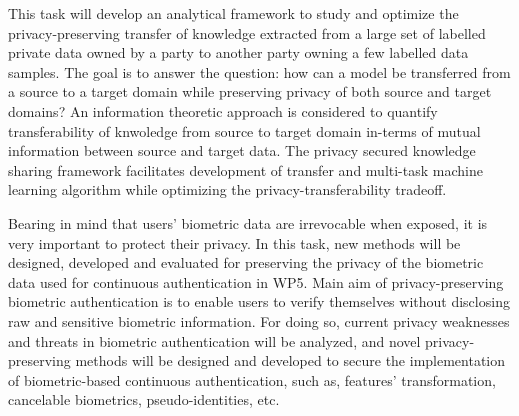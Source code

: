 \begin{Workpackage}{\thewpno}
 \begin{Task}
  
  \TaskResults{%
  }
  \TaskHeader{}
  This task will develop an analytical framework to study and optimize the privacy-preserving transfer of knowledge extracted from a large set of labelled private data owned by a party to another party owning a few labelled data samples. The goal is to answer the question: how can a model be transferred from a source to a target domain while preserving privacy of both source and target domains? An information theoretic approach is considered to quantify transferability of knwoledge from source to target domain in-terms of mutual information between source and target data. The privacy secured knowledge sharing framework facilitates development of transfer and multi-task machine learning algorithm while optimizing the privacy-transferability tradeoff.
 \end{Task}

  
 
 
 \begin{Task}
  
  \TaskResults{%
  }
  \TaskHeader{}
  Bearing in mind that users' biometric data are irrevocable when exposed, it is very important to protect their privacy. In this task, new methods will be designed, developed and evaluated for preserving the privacy of the biometric data used for continuous authentication in WP5. Main aim of privacy-preserving biometric authentication is to enable users to verify themselves without disclosing raw and sensitive biometric information. For doing so, current privacy weaknesses and threats in biometric authentication will be analyzed, and novel privacy-preserving methods will be designed and developed to secure the implementation of biometric-based continuous authentication, such as, features' transformation, cancelable biometrics, pseudo-identities, etc.
 \end{Task}
 

\end{Workpackage}
